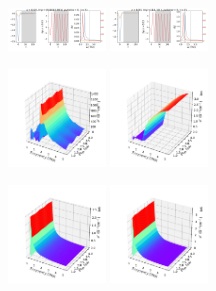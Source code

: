 \documentclass[a4paper]{article}
\begin{document}
\begin{figure}[H]
  \centering
  \includegraphics[width=0.23\textwidth]{HL-A1-v3-imp0.pdf}
  \includegraphics[width=0.23\textwidth]{HL-A1-v3-imp3.pdf}
\end{figure}
\begin{figure}[H]
  \centering
  \includegraphics[width=0.23\textwidth]{cond3d_real-A1-v3-imp0.pdf}
  \includegraphics[width=0.23\textwidth]{cond3d_real-A1-v3-imp3.pdf}
\end{figure}
\begin{figure}[H]
  \centering
  \includegraphics[width=0.23\textwidth]{cond3d_imag-A1-v3-imp0.pdf}
  \includegraphics[width=0.23\textwidth]{cond3d_imag-A1-v3-imp3.pdf}
\end{figure}
\end{document}
